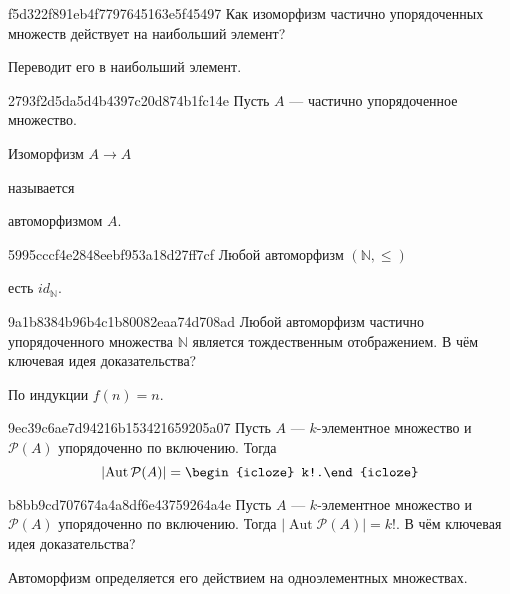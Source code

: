\begin{note}{f5d322f891eb4f7797645163e5f45497}
    Как изоморфизм частично упорядоченных множеств действует на наибольший элемент?

    \begin{cloze}{1}
        Переводит его в наибольший элемент.
    \end{cloze}
\end{note}

\begin{note}{2793f2d5da5d4b4397c20d874b1fc14e}
    Пусть \({ A }\) --- частично упорядоченное множество.
    \begin{icloze}{2}Изоморфизм \({ A \to A }\)\end{icloze} называется \begin{icloze}{1}автоморфизмом \({ A }\).\end{icloze}
\end{note}

\begin{note}{5995cccf4e2848eebf953a18d27ff7cf}
    Любой автоморфизм \({ (\mathbb N, \leqslant) }\) \begin{icloze}{1}есть \({ id_{\mathbb N} }\).\end{icloze}
\end{note}

\begin{note}{9a1b8384b96b4c1b80082eaa74d708ad}
    Любой автоморфизм частично упорядоченного множества \({ \mathbb N }\) является тождественным отображением.
    В чём ключевая идея доказательства?

    \begin{cloze}{1}
        По индукции \({ f(n) = n }\).
    \end{cloze}
\end{note}

\begin{note}{9ec39c6ae7d94216b153421659205a07}
    Пусть \({ A }\) --- \({ k }\)-элементное множество и \({ \mathcal P(A) }\) упорядоченно по включению.
    Тогда
    \[
        \left\lvert \operatorname{Aut} \mathcal P(A) \right\rvert = \begin{icloze}{1}k!.\end{icloze}
    \]
\end{note}

\begin{note}{b8bb9cd707674a4a8df6e43759264a4e}
    Пусть \({ A }\) --- \({ k }\)-элементное множество и \({ \mathcal P(A) }\) упорядоченно по включению.
    Тогда \({ \left\lvert \operatorname{Aut} \mathcal P(A) \right\rvert = k! }\).
    В чём ключевая идея доказательства?

    \begin{cloze}{1}
        Автоморфизм определяется его действием на одно\-э\-ле\-мен\-тных множествах.
    \end{cloze}
\end{note}

